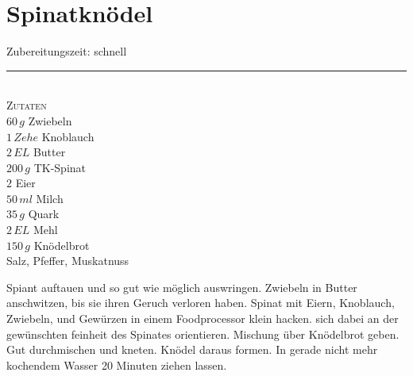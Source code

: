

\section{Spinatknödel}\label{sec:spinatknoedel}
\begin{minipage}[t]{0.3\textwidth}
    Zubereitungszeit: schnell\\
    \noindent\rule[1ex]{\textwidth}{1pt}\\
    \textsc{Zutaten}\\
    $60\,g$ Zwiebeln\\
    $1\,Zehe$ Knoblauch\\
    $2\,EL$ Butter\\
    $200\,g$ TK-Spinat\\
    $2$ Eier\\
    $50\,ml$ Milch\\
    $35\,g$ Quark\\
    $2\,EL$ Mehl\\
    $150\,g$ Knödelbrot\\
    Salz, Pfeffer, Muskatnuss\\
\end{minipage}
\begin{minipage}[t]{0.69\textwidth}
    Spiant auftauen und so gut wie möglich auswringen.
    Zwiebeln in Butter anschwitzen, bis sie ihren Geruch verloren haben.
    Spinat mit Eiern, Knoblauch, Zwiebeln, und Gewürzen in einem Foodprocessor klein hacken.
    sich dabei an der gewünschten feinheit des Spinates orientieren.
    Mischung über Knödelbrot geben.
    Gut durchmischen und kneten.
    Knödel daraus formen.
    In gerade nicht mehr kochendem Wasser 20 Minuten ziehen lassen.
\end{minipage}
\newpage


